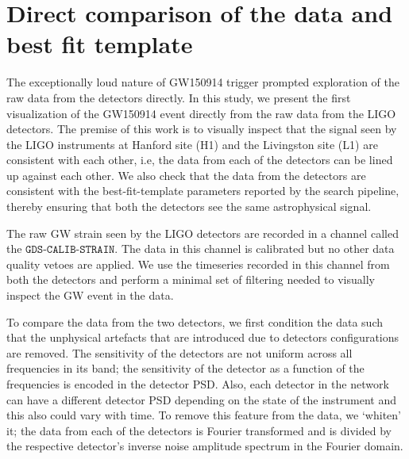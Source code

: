 \section{Direct comparison of the data and best fit template}
\label{sec:dirrect-comparision}
The exceptionally loud nature of GW150914 trigger prompted exploration of the raw data from the detectors directly. In this study, we present the first visualization of the GW150914 event directly from the raw data from the LIGO detectors. The premise of this work is to visually inspect that the signal seen by the LIGO instruments at Hanford site (H1) and the Livingston site (L1) are consistent with each other, i.e, the data from each of the detectors can be lined up against each other. We also check that the data from the detectors are consistent with the best-fit-template parameters reported by the search pipeline, thereby ensuring that both the detectors see the same astrophysical signal. 


The raw GW strain seen by the LIGO detectors are recorded in a channel called the $\texttt{GDS-CALIB-STRAIN}$. The data in this channel is calibrated but no other data quality vetoes are applied. We use the timeseries recorded in this channel from both the detectors and perform a minimal set of filtering needed to visually inspect the GW event in the data.

To compare the data from the two detectors, we first condition the data such that the unphysical artefacts that are introduced due to detectors configurations are removed.  The sensitivity of the detectors are not uniform across all frequencies in its band; the sensitivity of the detector as a function of the frequencies is encoded in the detector PSD. Also, each detector in the network can have a different detector PSD depending on the state of the instrument and this also could vary with time. To remove this feature from the data, we `whiten' it;  the data from each of the detectors is Fourier transformed and is divided by the respective detector's inverse noise amplitude spectrum in the Fourier domain. 

